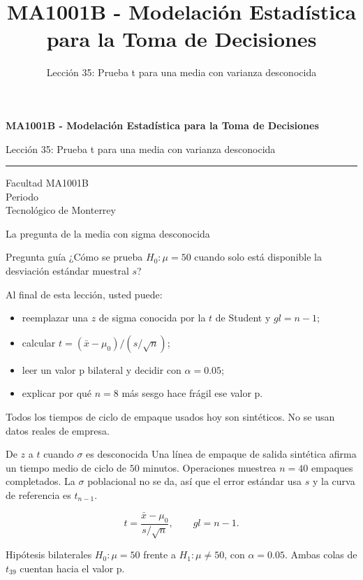 \documentclass[aspectratio=169,10pt,spanish]{beamer}
\title{MA1001B - Modelación Estadística para la Toma de Decisiones}
\subtitle{Lección 35: Prueba t para una media con varianza desconocida}
\author{}
\institute{Tecnol\'ogico de Monterrey}
\date{}
\begin{document}
\begin{frame}[plain]
  \vspace{1.2cm}
  {\Large\bfseries MA1001B - Modelación Estadística para la Toma de Decisiones\par}
  \vspace{0.7cm}
  {\large Lección 35: Prueba t para una media con varianza desconocida\par}
  \vspace{0.7cm}
  {\color{TecRojo}\rule{\textwidth}{1.2pt}}
  \vspace{0.8cm}

  Facultad MA1001B\\[0.3cm]
  Periodo\\[0.3cm]
  Tecnol\'ogico de Monterrey
\end{frame}

\begin{frame}{La pregunta de la media con sigma desconocida}
  \begin{alertblock}{Pregunta guía}
    ¿Cómo se prueba $H_0:\mu=50$ cuando solo está disponible la desviación
    estándar muestral $s$?
  \end{alertblock}

  \vspace{0.6em}
  Al final de esta lección, usted puede:
  \begin{itemize}
    \item reemplazar una $z$ de sigma conocida por la $t$ de Student y $gl=n-1$;
    \item calcular $t=(\bar{x}-\mu_0)/(s/\sqrt{n})$;
    \item leer un valor p bilateral y decidir con $\alpha=0.05$;
    \item explicar por qué $n=8$ más sesgo hace frágil ese valor p.
  \end{itemize}

  \vfill
  \scriptsize Todos los tiempos de ciclo de empaque usados hoy son sintéticos. No se usan datos reales de empresa.
\end{frame}

\begin{frame}{De $z$ a $t$ cuando $\sigma$ es desconocida}
  \small
  Una línea de empaque de salida sintética afirma un tiempo medio de ciclo de
  $50$ minutos. Operaciones muestrea $n=40$ empaques completados. La $\sigma$
  poblacional no se da, así que el error estándar usa $s$ y la curva de
  referencia es $t_{n-1}$.

  \[
    t=\frac{\bar{x}-\mu_0}{s/\sqrt{n}},\qquad gl=n-1.
  \]

  \begin{exampleblock}{Hipótesis bilaterales}
    $H_0:\mu=50$ frente a $H_1:\mu\neq 50$, con $\alpha=0.05$. Ambas colas de
    $t_{39}$ cuentan hacia el valor p.
  \end{exampleblock}
\end{frame}
\end{document}
